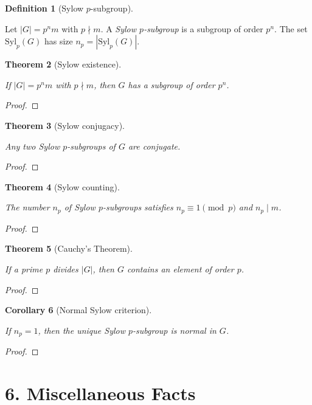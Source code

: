 \documentclass[11pt,letterpaper]{article}
\newtheorem{theorem}{Theorem}
\newtheorem{corollary}[theorem]{Corollary}
\theoremstyle{definition}
\newtheorem{definition}[theorem]{Definition}
\theoremstyle{remark}
\newcommand{\Syl}{\mathrm{Syl}}
\newcommand{\uses}[1]{}
\begin{document}
\begin{definition}[Sylow $p$-subgroup]\label{def:sylow}
\uses{def:subgroup}
Let $|G|=p^n m$ with $p\nmid m$. A \emph{Sylow $p$-subgroup} is a subgroup of order $p^n$. The set $\Syl_p(G)$ has size $n_p=|\Syl_p(G)|$.
\end{definition}

\begin{theorem}[Sylow existence]\label{thm:sylow_exist}
\uses{def:sylow}
If $|G|=p^n m$ with $p\nmid m$, then $G$ has a subgroup of order $p^n$.
\end{theorem}
\begin{proof}\uses{thm:class-eq, thm:cauchy}\end{proof}

\begin{theorem}[Sylow conjugacy]\label{thm:sylow_conjugacy}
\uses{def:sylow}
Any two Sylow $p$-subgroups of $G$ are conjugate.
\end{theorem}
\begin{proof}\uses{thm:orbit_stabilizer}\end{proof}

\begin{theorem}[Sylow counting]\label{thm:sylow_count}
\uses{def:sylow}
The number $n_p$ of Sylow $p$-subgroups satisfies $n_p\equiv 1\pmod p$ and $n_p\mid m$.
\end{theorem}
\begin{proof}\uses{thm:sylow_conjugacy, thm:orbit_stabilizer}\end{proof}

\begin{theorem}[Cauchy's Theorem]\label{thm:cauchy}
\uses{def:order}
If a prime $p$ divides $|G|$, then $G$ contains an element of order $p$.
\end{theorem}
\begin{proof}\uses{thm:class_eq}\end{proof}

\begin{corollary}[Normal Sylow criterion]\label{cor:unique_sylow_normal}
\uses{def:normal_subgroup}
If $n_p=1$, then the unique Sylow $p$-subgroup is normal in $G$.
\end{corollary}
\begin{proof}\uses{thm:sylow_conjugacy}\end{proof}

\section*{6. Miscellaneous Facts}
\end{document}
